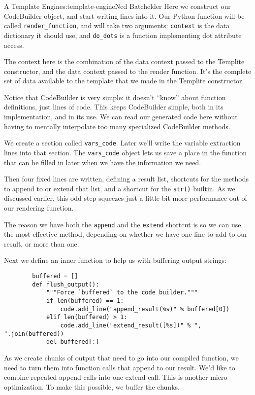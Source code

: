 \begin{aosachapter}{A Template Engine}{s:template-engine}{Ned Batchelder}
Here we construct our CodeBuilder object, and start writing lines into
it. Our Python function will be called \texttt{render\_function}, and
will take two arguments: \texttt{context} is the data dictionary it
should use, and \texttt{do\_dots} is a function implementing dot
attribute access.

The context here is the combination of the data context passed to the
Templite constructor, and the data context passed to the render
function. It's the complete set of data available to the template that
we made in the Templite constructor.

Notice that CodeBuilder is very simple: it doesn't ``know'' about
function definitions, just lines of code. This keeps CodeBuilder simple,
both in its implementation, and in its use. We can read our generated
code here without having to mentally interpolate too many specialized
CodeBuilder methods.

We create a section called \texttt{vars\_code}. Later we'll write the
variable extraction lines into that section. The \texttt{vars\_code}
object lets us save a place in the function that can be filled in later
when we have the information we need.

Then four fixed lines are written, defining a result list, shortcuts for
the methods to append to or extend that list, and a shortcut for the
\texttt{str()} builtin. As we discussed earlier, this odd step squeezes
just a little bit more performance out of our rendering function.

The reason we have both the \texttt{append} and the \texttt{extend}
shortcut is so we can use the most effective method, depending on
whether we have one line to add to our result, or more than one.

Next we define an inner function to help us with buffering output
strings:

\begin{verbatim}
        buffered = []
        def flush_output():
            """Force `buffered` to the code builder."""
            if len(buffered) == 1:
                code.add_line("append_result(%s)" % buffered[0])
            elif len(buffered) > 1:
                code.add_line("extend_result([%s])" % ", ".join(buffered))
            del buffered[:]
\end{verbatim}

As we create chunks of output that need to go into our compiled
function, we need to turn them into function calls that append to our
result. We'd like to combine repeated append calls into one extend call.
This is another micro-optimization. To make this possible, we buffer the
chunks.


\end{aosachapter}
